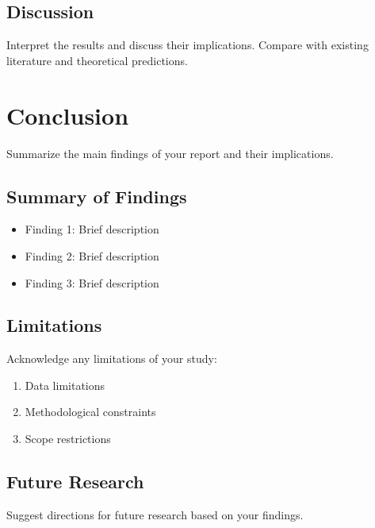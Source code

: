 \documentclass[12pt,a4paper]{article}
\theoremstyle{definition}
\begin{document}
\subsection{Discussion}
\label{subsec:discussion}

Interpret the results and discuss their implications. Compare with existing
literature and theoretical predictions.

\section{Conclusion}
\label{sec:conclusion}

Summarize the main findings of your report and their implications.

\subsection{Summary of Findings}
\label{subsec:summary}

\begin{itemize}
    \item Finding 1: Brief description
    \item Finding 2: Brief description
    \item Finding 3: Brief description
\end{itemize}

\subsection{Limitations}
\label{subsec:limitations}

Acknowledge any limitations of your study:
\begin{enumerate}
    \item Data limitations
    \item Methodological constraints
    \item Scope restrictions
\end{enumerate}

\subsection{Future Research}
\label{subsec:future}

Suggest directions for future research based on your findings.

\end{document}
